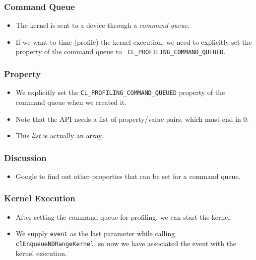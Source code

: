 \documentclass{beamer}
\begin{document}
\begin{frame}
  \frametitle{Command Queue}
  \begin{itemize}
    \item The kernel is sent to a device through a {\em command
      queue}.
    \item If we want to time (profile) the kernel execution, we need
      to explicitly set the property of the command queue to {\tt
        CL\_PROFILING\_COMMAND\_QUEUED}.  
  \end{itemize}
\end{frame}

\begin{frame}
\end{frame}

\begin{frame}
  \frametitle{Property}
  \begin{itemize}
    \item We explicitly set the {\tt CL\_PROFILING\_COMMAND\_QUEUED}
      property of the command queue when we created it.
    \item Note that the API needs a list of property/value pairs, which must end in 0.
    \item This {\em list} is actually an array.
  \end{itemize}
\end{frame}

\begin{frame}
\end{frame}

\begin{frame}
  \frametitle{Discussion}
  \begin{itemize}
    \item Google to find out other properties that can be set for a
      command queue.
  \end{itemize}
\end{frame}

\begin{frame}
  \frametitle{Kernel Execution}
  \begin{itemize}
  \item After setting the command queue for profiling, we can start
    the kernel.
  \item We supply {\tt event} as the last parameter while calling
    {\tt clEnqueueNDRangeKernel}, so now we have associated the
    event with the kernel execution.
  \end{itemize}
\end{frame}
\end{document}
